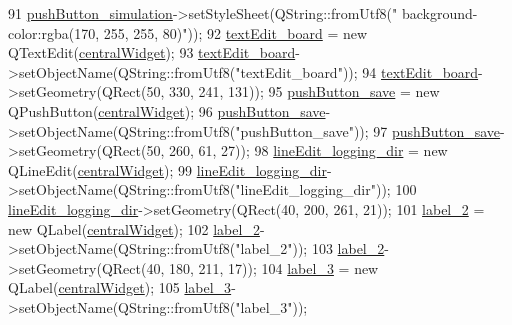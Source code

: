 \begin{DoxyCode}
91         \hyperlink{class_ui___main_window_afd109ead0ad1ae7ae67ad1df803c9c38}{pushButton\_simulation}->setStyleSheet(QString::fromUtf8(\textcolor{stringliteral}{"
      background-color:rgba(170, 255, 255, 80)"}));
92         \hyperlink{class_ui___main_window_af13441b9fd874f1aeb2ec5cefaeb0bce}{textEdit\_board} = \textcolor{keyword}{new} QTextEdit(\hyperlink{class_ui___main_window_a30075506c2116c3ed4ff25e07ae75f81}{centralWidget});
93         \hyperlink{class_ui___main_window_af13441b9fd874f1aeb2ec5cefaeb0bce}{textEdit\_board}->setObjectName(QString::fromUtf8(\textcolor{stringliteral}{"textEdit\_board"}));
94         \hyperlink{class_ui___main_window_af13441b9fd874f1aeb2ec5cefaeb0bce}{textEdit\_board}->setGeometry(QRect(50, 330, 241, 131));
95         \hyperlink{class_ui___main_window_a257d4df0fe652a526e4fddba93c7a7d8}{pushButton\_save} = \textcolor{keyword}{new} QPushButton(\hyperlink{class_ui___main_window_a30075506c2116c3ed4ff25e07ae75f81}{centralWidget});
96         \hyperlink{class_ui___main_window_a257d4df0fe652a526e4fddba93c7a7d8}{pushButton\_save}->setObjectName(QString::fromUtf8(\textcolor{stringliteral}{"pushButton\_save"}));
97         \hyperlink{class_ui___main_window_a257d4df0fe652a526e4fddba93c7a7d8}{pushButton\_save}->setGeometry(QRect(50, 260, 61, 27));
98         \hyperlink{class_ui___main_window_a7ab71242b81ef9d13f83c16f6328f35d}{lineEdit\_logging\_dir} = \textcolor{keyword}{new} QLineEdit(\hyperlink{class_ui___main_window_a30075506c2116c3ed4ff25e07ae75f81}{centralWidget});
99         \hyperlink{class_ui___main_window_a7ab71242b81ef9d13f83c16f6328f35d}{lineEdit\_logging\_dir}->setObjectName(QString::fromUtf8(\textcolor{stringliteral}{"lineEdit\_logging\_dir"}));
100         \hyperlink{class_ui___main_window_a7ab71242b81ef9d13f83c16f6328f35d}{lineEdit\_logging\_dir}->setGeometry(QRect(40, 200, 261, 21));
101         \hyperlink{class_ui___main_window_a2e2516d755e4dd53fc905dabddf2738a}{label\_2} = \textcolor{keyword}{new} QLabel(\hyperlink{class_ui___main_window_a30075506c2116c3ed4ff25e07ae75f81}{centralWidget});
102         \hyperlink{class_ui___main_window_a2e2516d755e4dd53fc905dabddf2738a}{label\_2}->setObjectName(QString::fromUtf8(\textcolor{stringliteral}{"label\_2"}));
103         \hyperlink{class_ui___main_window_a2e2516d755e4dd53fc905dabddf2738a}{label\_2}->setGeometry(QRect(40, 180, 211, 17));
104         \hyperlink{class_ui___main_window_a0376fd90247280e7c7957cc70628708c}{label\_3} = \textcolor{keyword}{new} QLabel(\hyperlink{class_ui___main_window_a30075506c2116c3ed4ff25e07ae75f81}{centralWidget});
105         \hyperlink{class_ui___main_window_a0376fd90247280e7c7957cc70628708c}{label\_3}->setObjectName(QString::fromUtf8(\textcolor{stringliteral}{"label\_3"}));

\end{DoxyCode}
